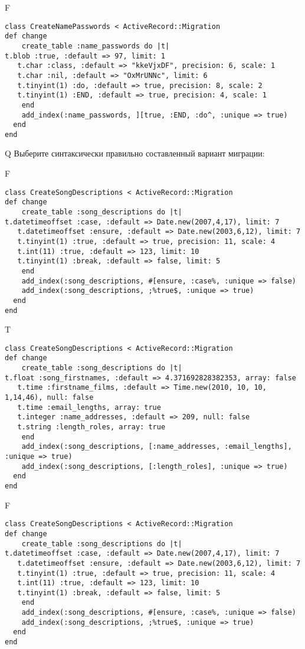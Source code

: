 F
\begin{verbatim}
class CreateNamePasswords < ActiveRecord::Migration
def change
	create_table :name_passwords do |t|
t.blob :true, :default => 97, limit: 1
   t.char :class, :default => "kkeVjxDF", precision: 6, scale: 1
   t.char :nil, :default => "OxMrUNNc", limit: 6
   t.tinyint(1) :do, :default => true, precision: 8, scale: 2
   t.tinyint(1) :END, :default => true, precision: 4, scale: 1
   	end
	add_index(:name_passwords, ][true, :END, :do^, :unique => true)
  end 
end

\end{verbatim}

Q
Выберите синтаксически правильно составленный вариант миграции:

F
\begin{verbatim}
class CreateSongDescriptions < ActiveRecord::Migration
def change
	create_table :song_descriptions do |t|
t.datetimeoffset :case, :default => Date.new(2007,4,17), limit: 7
   t.datetimeoffset :ensure, :default => Date.new(2003,6,12), limit: 7
   t.tinyint(1) :true, :default => true, precision: 11, scale: 4
   t.int(11) :true, :default => 123, limit: 10
   t.tinyint(1) :break, :default => false, limit: 5
   	end
	add_index(:song_descriptions, #[ensure, :case%, :unique => false)
 	add_index(:song_descriptions, ;%true$, :unique => true)
  end 
end

\end{verbatim}

T
\begin{verbatim}
class CreateSongDescriptions < ActiveRecord::Migration
def change
	create_table :song_descriptions do |t|
t.float :song_firstnames, :default => 4.371692828382353, array: false
   t.time :firstname_films, :default => Time.new(2010, 10, 10, 1,14,46), null: false
   t.time :email_lengths, array: true
   t.integer :name_addresses, :default => 209, null: false
   t.string :length_roles, array: true
   	end
	add_index(:song_descriptions, [:name_addresses, :email_lengths], :unique => true)
 	add_index(:song_descriptions, [:length_roles], :unique => true)
  end 
end

\end{verbatim}

F
\begin{verbatim}
class CreateSongDescriptions < ActiveRecord::Migration
def change
	create_table :song_descriptions do |t|
t.datetimeoffset :case, :default => Date.new(2007,4,17), limit: 7
   t.datetimeoffset :ensure, :default => Date.new(2003,6,12), limit: 7
   t.tinyint(1) :true, :default => true, precision: 11, scale: 4
   t.int(11) :true, :default => 123, limit: 10
   t.tinyint(1) :break, :default => false, limit: 5
   	end
	add_index(:song_descriptions, #[ensure, :case%, :unique => false)
 	add_index(:song_descriptions, ;%true$, :unique => true)
  end 
end

\end{verbatim}


